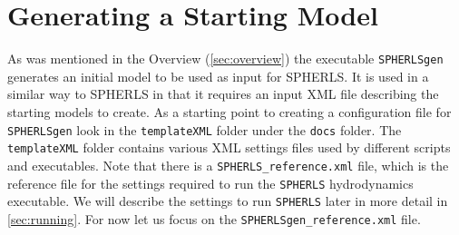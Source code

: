 \documentclass[12pt,a4paper]{book}
\begin{document}

\section{Generating a Starting Model}
As was mentioned in the Overview (\autoref{sec:overview}) the executable {\tt SPHERLSgen} generates an initial model to be used as input for SPHERLS. It is used in a similar way to SPHERLS in that it requires an input XML file describing the starting models to create. As a starting point to creating a configuration file for {\tt SPHERLSgen} look in the {\tt templateXML} folder under the {\tt docs} folder. The {\tt templateXML} folder contains various XML settings files used by different scripts and executables. Note that there is a {\tt SPHERLS\_reference.xml} file, which is the reference file for the settings required to run the {\tt SPHERLS} hydrodynamics executable. We will describe the settings to run {\tt SPHERLS} later in more detail in \autoref{sec:running}. For now let us focus on the {\tt SPHERLSgen\_reference.xml} file.
\end{document}
